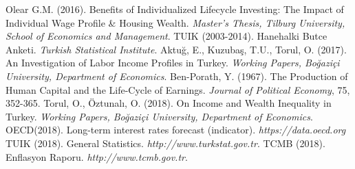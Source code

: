 \documentclass[]{elsarticle}
\begin{document}
\begin{thebibliography}{}
 Olear G.M. (2016). Benefits of Individualized Lifecycle Investing: The Impact of Individual Wage Profile \& Housing Wealth. \textit{Master's Thesis, Tilburg University, School of Economics and Management}.
 TUIK (2003-2014). Hanehalki Butce Anketi. \textit{Turkish Statistical Institute}.
 Aktuğ, E., Kuzubaş, T.U., Torul, O. (2017). An Investigation of Labor Income Profiles in Turkey. \textit{Working Papers, Boğaziçi  University, Department of Economics}.
 Ben-Porath, Y. (1967). The  Production  of  Human  Capital  and  the  Life-Cycle  of  Earnings. \textit{Journal of Political Economy}, 75, 352-365.
 Torul, O., Öztunalı, O. (2018). On Income and Wealth Inequality in Turkey. \textit{Working Papers, Boğaziçi University, Department of Economics}.
 OECD(2018). Long-term interest rates forecast (indicator). \textit{https://data.oecd.org}
 TUIK (2018). General Statistics. \textit{http://www.turkstat.gov.tr}.
 TCMB (2018). Enflasyon Raporu. \textit{http://www.tcmb.gov.tr}.
\end{thebibliography}
\end{document}
